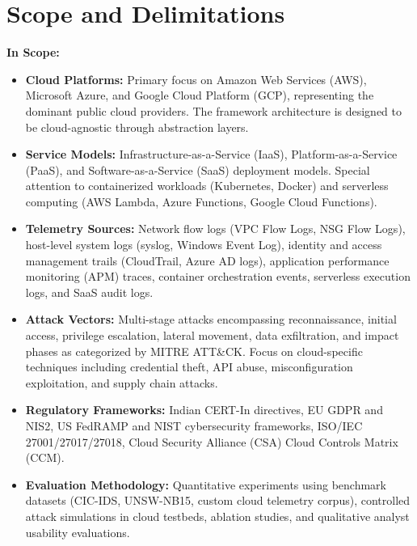\section{Scope and Delimitations}\label{sec:intro-scope}
\textbf{In Scope:}
\begin{itemize}
    \item \textbf{Cloud Platforms:} Primary focus on Amazon Web Services (AWS), Microsoft Azure, and Google Cloud Platform (GCP), representing the dominant public cloud providers. The framework architecture is designed to be cloud-agnostic through abstraction layers.
    \item \textbf{Service Models:} Infrastructure-as-a-Service (IaaS), Platform-as-a-Service (PaaS), and Software-as-a-Service (SaaS) deployment models. Special attention to containerized workloads (Kubernetes, Docker) and serverless computing (AWS Lambda, Azure Functions, Google Cloud Functions).
    \item \textbf{Telemetry Sources:} Network flow logs (VPC Flow Logs, NSG Flow Logs), host-level system logs (syslog, Windows Event Log), identity and access management trails (CloudTrail, Azure AD logs), application performance monitoring (APM) traces, container orchestration events, serverless execution logs, and SaaS audit logs.
    \item \textbf{Attack Vectors:} Multi-stage attacks encompassing reconnaissance, initial access, privilege escalation, lateral movement, data exfiltration, and impact phases as categorized by MITRE ATT\&CK. Focus on cloud-specific techniques including credential theft, API abuse, misconfiguration exploitation, and supply chain attacks.
    \item \textbf{Regulatory Frameworks:} Indian CERT-In directives, EU GDPR and NIS2, US FedRAMP and NIST cybersecurity frameworks, ISO/IEC 27001/27017/27018, Cloud Security Alliance (CSA) Cloud Controls Matrix (CCM).
    \item \textbf{Evaluation Methodology:} Quantitative experiments using benchmark datasets (CIC-IDS, UNSW-NB15, custom cloud telemetry corpus), controlled attack simulations in cloud testbeds, ablation studies, and qualitative analyst usability evaluations.
\end{itemize}

